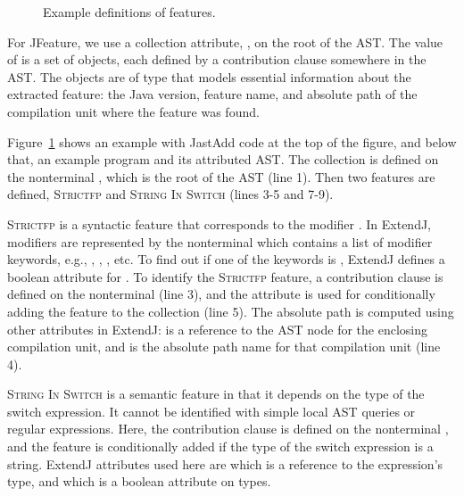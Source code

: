 \begin{figure}[H]
\caption{\label{fig:featureExample}Example definitions of features.}
\end{figure}

For JFeature, we use a collection attribute, , on the root of the AST.
The value of  is a set of objects, each defined by a contribution clause somewhere in the AST.
The objects are of type  that
models essential information about the extracted feature: the Java version, feature name, and absolute path of the compilation unit where the feature was found.

Figure~\ref{fig:featureExample} shows an example with JastAdd code at the top of the figure, and below that, an example program and its attributed AST.
The  collection is defined on the nonterminal , which is the root of the AST (line 1). Then two features are defined, \textsc{Strictfp} and \textsc{String In Switch} (lines 3-5 and 7-9).

\textsc{Strictfp} is a syntactic feature that corresponds to the modifier .
In ExtendJ, modifiers are represented by the nonterminal  which contains a list of modifier keywords, e.g., , , , etc.
To find out if one of the keywords is , ExtendJ defines a boolean attribute  for .
To identify the \textsc{Strictfp} feature, a contribution clause is defined on the nonterminal  (line 3), and the  attribute is used for conditionally adding the feature to the collection (line 5).
The absolute path is computed using other attributes in ExtendJ:  is a reference to the AST node for the enclosing compilation unit, and  is the absolute path name for that compilation unit (line 4).

\textsc{String In Switch} is a semantic feature in that it depends on the type of the switch expression. It cannot be identified with simple local AST queries or regular expressions. Here, the contribution clause is defined on the nonterminal , and the feature is conditionally added if the type of the switch expression is a string. ExtendJ attributes used here are  which is a reference to the expression's type, and  which is a boolean attribute on types.





